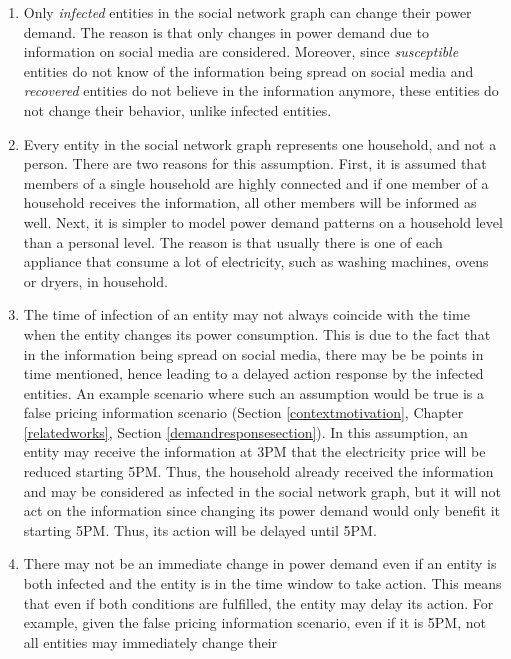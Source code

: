 \begin{enumerate}
    \item Only \textit{infected} entities in 
    the social network graph can change their power demand. The reason is 
    that only changes in power demand due to information on social media
    are considered. Moreover, since \textit{susceptible} entities
    do not know of the information being spread on social media and 
    \textit{recovered} entities do not believe in the information anymore,
    these entities do not change their behavior, 
    unlike infected entities.
    \item Every entity in the social network graph 
    represents one household, and not a person. There are 
    two reasons for this assumption. First, it is assumed that 
    members of a single household are highly connected and if one 
    member of a household receives the information, all other members
    will be informed as well. Next, it is simpler to model power demand
    patterns on a household level than a personal level. The reason
    is that usually
    there is one of each appliance that consume a lot of electricity, 
    such as washing machines, ovens or dryers, in household.
    \item The time of infection of an entity may not
    always coincide with the time when the entity changes its 
    power consumption. This is due to the fact that in the information
    being spread on social media, there may be be points in time
    mentioned, hence leading to a delayed action response by the
    infected entities. An example scenario where such an assumption
    would be true is a false pricing information scenario 
    (Section \ref{contextmotivation}, Chapter 
    \ref{relatedworks}, Section \ref{demandresponsesection}).
    In this assumption, an entity may receive the information 
    at 3PM that the electricity price will be reduced 
    starting 5PM. Thus, the household already received the
    information and may be considered as infected in the social network
    graph, but it will not act on the information since changing
    its power demand would only benefit it starting 5PM. Thus, its 
    action will be delayed until 5PM. 
    \item There may not be an immediate change 
    in power demand even if an entity is both infected and the entity 
    is in the time window to take action. This means that even if
    both conditions are fulfilled, the entity may delay its action. 
    For example, given the false pricing information scenario, 
    even if it is 5PM, not all entities may immediately change their 

\end{enumerate}
